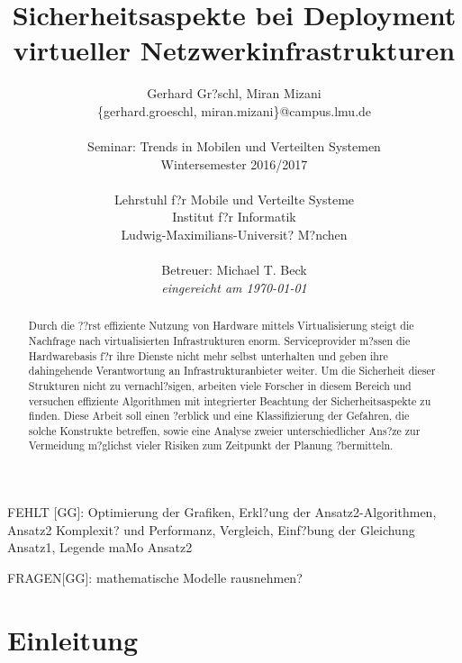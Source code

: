\documentclass{lni}
\author{Gerhard Gr?schl, Miran Mizani\\\{gerhard.groeschl, miran.mizani\}@campus.lmu.de\\\\
Seminar: Trends in Mobilen und Verteilten Systemen \\Wintersemester 2016/2017\\\\
Lehrstuhl f?r Mobile und Verteilte Systeme\\Institut f?r Informatik\\Ludwig-Maximilians-Universit? M?nchen\\\\
Betreuer: Michael T. Beck\\\textit{eingereicht am \today}}
\title{Sicherheitsaspekte bei Deployment virtueller Netzwerkinfrastrukturen}
\begin{document}
\maketitle

\vfill
FEHLT [GG]: Optimierung der Grafiken, Erkl?ung der Ansatz2-Algorithmen, Ansatz2 Komplexit? und Performanz, Vergleich, Einf?bung der Gleichung Ansatz1, Legende maMo Ansatz2

FRAGEN[GG]: mathematische Modelle rausnehmen?

\begin{abstract}
Durch die ??rst effiziente Nutzung von Hardware mittels Virtualisierung steigt die Nachfrage nach virtualisierten Infrastrukturen enorm. Serviceprovider m?ssen die Hardwarebasis f?r ihre Dienste nicht mehr selbst unterhalten und geben ihre dahingehende Verantwortung an Infrastrukturanbieter weiter. Um die Sicherheit dieser Strukturen nicht zu vernachl?sigen, arbeiten viele Forscher in diesem Bereich und versuchen effiziente Algorithmen mit integrierter Beachtung der Sicherheitsaspekte zu finden. Diese Arbeit soll einen ?erblick und eine Klassifizierung der Gefahren, die solche Konstrukte betreffen, sowie eine Analyse zweier unterschiedlicher Ans?ze zur Vermeidung m?glichst vieler Risiken zum Zeitpunkt der Planung ?bermitteln.
\end{abstract}


\newpage
\tableofcontents
\newpage

\section{Einleitung}
\label{sec:Einleitung}





\end{document}
